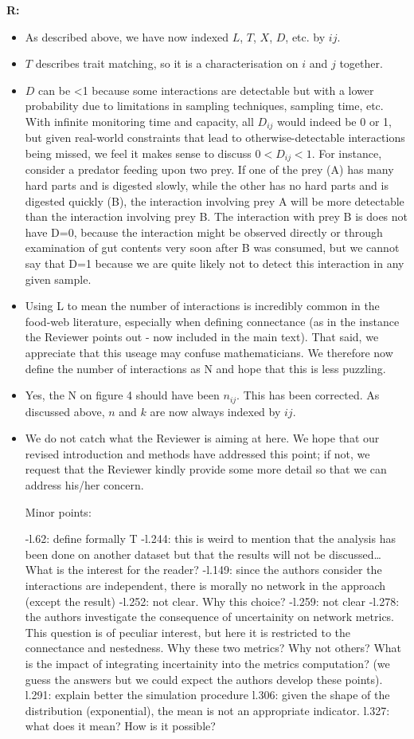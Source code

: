 \documentclass[12pt]{letter}
\begin{document}
	\textbf{R:} 
		\begin{itemize}
			\item As described above, we have now indexed $L$, $T$, $X$, $D$, etc. by $ij$. 
			\item $T$ describes trait matching, so it is a characterisation on $i$ and $j$ together. 
			\item $D$ can be \textless1 because some interactions are detectable but with a lower probability due to limitations in sampling techniques, sampling time, etc. With infinite monitoring time and capacity, all $D_{ij}$ would indeed be 0 or 1, but given real-world constraints that lead to otherwise-detectable interactions being missed, we feel it makes sense to discuss $0<D_{ij}<1$. For instance, consider a predator feeding upon two prey. If one of the prey (A) has many hard parts and is digested slowly, while the other has no hard parts and is digested quickly (B), the interaction involving prey A will be more detectable than the interaction involving prey B. The interaction with prey B is does not have D=0, because the interaction might be observed directly or through examination of gut contents very soon after B was consumed, but we cannot say that D=1 because we are quite likely not to detect this interaction in any given sample.
			\item Using L to mean the number of interactions is incredibly common in the food-web literature, especially when defining connectance (as in the instance the Reviewer points out - now included in the main text). That said, we appreciate that this useage may confuse mathematicians. We therefore now define the number of interactions as N and hope that this is less puzzling.
			\item Yes, the N on figure 4 should have been $n_{ij}$. This has been corrected. As discussed above, $n$ and $k$ are now always indexed by $ij$. 
			\item We do not catch what the Reviewer is aiming at here. We hope that our revised introduction and methods have addressed this point; if not, we request that the Reviewer kindly provide some more detail so that we can address his/her concern.


	Minor points:

	-l.62: define formally T
	-l.244: this is weird to mention that the analysis has been done on another dataset but that the results will not be discussed… What is the interest for the reader?
	-l.149: since the authors consider the interactions are independent, there is morally no network in the approach (except the result)
	-l.252: not clear. Why this choice?
	-l.259: not clear
	-l.278: the authors investigate the consequence of uncertainity on network metrics. This question is of peculiar interest, but here it is restricted to the connectance and nestedness. Why these two metrics? Why not others? What is the impact of integrating incertainity into the metrics computation? (we guess the answers but we could expect the authors develop these points).
	l.291: explain better the simulation procedure
	l.306: given the shape of the distribution (exponential), the mean is not an appropriate indicator.
	l.327: what does it mean? How is it possible?



\end{itemize}
\end{document}
